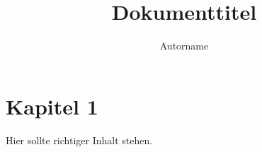 \documentclass[ngerman]{scrartcl|scrreprt|scrbook}
\title{Dokumenttitel}
\author{Autorname}
\begin{document}
 \maketitle

 \tableofcontents
 \cleardoublepage

 \section{Kapitel 1}
 \label{sec:kap1}

 Hier sollte richtiger Inhalt stehen.
\end{document}
